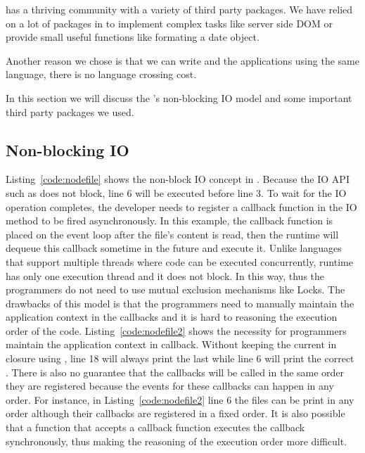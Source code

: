 \nodejs has a thriving community with a variety of third party packages.
We have relied on a lot of packages in \cb to implement complex tasks like
server side DOM or provide small useful functions like formating a date object.

Another reason we chose \nodejs is that we can write  \cb and the applications
using the same language, there is no language crossing cost.

In this section we will discuss the \nodejs's non-blocking IO model and some
important third party packages we used.

\subsection{Non-blocking IO}


Listing~\ref{code:nodefile} shows the non-block IO concept in \nodejs. Because
the IO API such as  does not block, line 6 will be executed
before line 3. To wait for the IO operation completes, the developer needs to
register a callback function in the IO method  to be fired asynchronously. In
this example, the callback function is placed on the event loop after the
file's content is read, then the runtime will dequeue this callback sometime
in the future and execute it. Unlike languages that support multiple threads
where code can be executed concurrently, \js runtime has only one execution
thread and it does not block. In this way,   thus the programmers do not need
to use mutual exclusion mechanisms like Locks. The drawbacks of this model is
that the programmers need to manually maintain the application context in the
callbacks  and  it is hard to reasoning the execution order of the code.
Listing~\ref{code:nodefile2} shows the necessity for programmers maintain the
application context in callback. Without keeping the current 
in closure using , line 18 will always print the
last  while line 6 will print the correct .
There is also no guarantee that the callbacks will be called in the same order
they are registered because the events for these callbacks can happen in any
order. For instance, in Listing~\ref{code:nodefile2} line 6 the files can be
print in any order although their callbacks are registered in a fixed order.
It is also possible that a function that accepts a callback function executes
the  callback synchronously,  thus making the reasoning of the execution order
more difficult.


